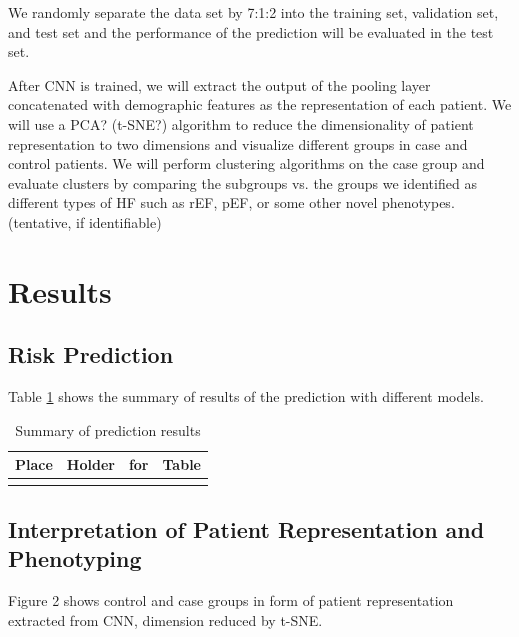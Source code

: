 \documentclass[11pt]{article}
\begin{document}
	We randomly separate the data set by 7:1:2 into the training set, validation set, and test set and the performance of the prediction will be evaluated in the test set.
	
	After CNN is trained, we will extract the output of the pooling layer concatenated with demographic features as the representation of each patient. We will use a PCA? (t-SNE?) algorithm to reduce the dimensionality of patient representation to two dimensions and visualize different groups in case and control patients. We will perform clustering algorithms on the case group and evaluate clusters by comparing the subgroups vs. the groups we identified as different types of HF such as rEF, pEF, or some other novel phenotypes. (tentative, if identifiable)
	
	
	\section{Results}
	\label{sec:interpret}
	
	\subsection{Risk Prediction}
	Table \ref{tab:predResults} shows the summary of results of the prediction with different models. 
	
\begin{table}
	\vspace*{3mm}
	\caption{Summary of prediction results}
	\label{tab:predResults}
	\vspace*{2mm}
	\centering
	\begin{tabular}{c|ccc}
		\hline
		Place & Holder & for & Table\\ 
		\hline
		&  &  & \\
		\hline
	\end{tabular}
\end{table}
	
	
	\subsection{Interpretation of Patient Representation and Phenotyping}
	
	Figure 2 shows control and case groups in form of patient representation extracted from CNN, dimension reduced by t-SNE.
	
\end{document}
